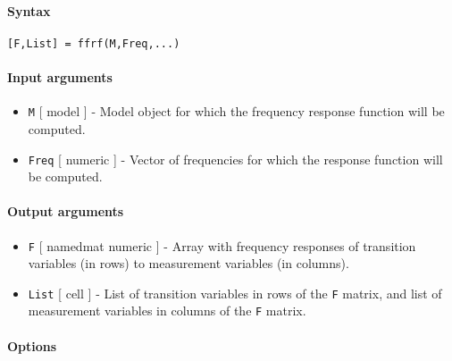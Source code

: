 


	\paragraph{Syntax}

\begin{verbatim}
[F,List] = ffrf(M,Freq,...)
\end{verbatim}

\paragraph{Input arguments}

\begin{itemize}
\item
  \texttt{M} {[} model {]} - Model object for which the frequency
  response function will be computed.
\item
  \texttt{Freq} {[} numeric {]} - Vector of frequencies for which the
  response function will be computed.
\end{itemize}

\paragraph{Output arguments}

\begin{itemize}
\item
  \texttt{F} {[} namedmat \textbar{} numeric {]} - Array with frequency
  responses of transition variables (in rows) to measurement variables
  (in columns).
\item
  \texttt{List} {[} cell {]} - List of transition variables in rows of
  the \texttt{F} matrix, and list of measurement variables in columns of
  the \texttt{F} matrix.
\end{itemize}

\paragraph{Options}

